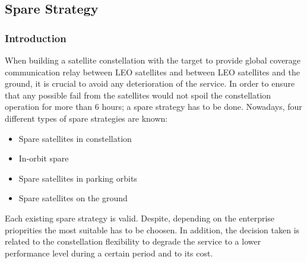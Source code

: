 \subsection{Spare Strategy}
\subsubsection{Introduction}
When building a satellite constellation with the target to provide global coverage communication relay between LEO satellites and between LEO satellites and the ground, it is crucial to avoid any deterioration of the service. In order to ensure that any possible fail from the satellites would not spoil the constellation operation for more than 6 hours; a spare strategy has to be done. Nowadays, four different types of spare strategies are known:
\begin{itemize} 

\item {Spare satellites in constellation}
\item {In-orbit spare} 
\item {Spare satellites in parking orbits} 
\item {Spare satellites on the ground} 

\end{itemize}
Each existing spare strategy is valid. Despite, depending on the enterprise prioprities the most suitable has to be choosen. In addition, the decision taken is related to the constellation flexibility to degrade the service to a lower performance level during a certain period and to its cost. 

